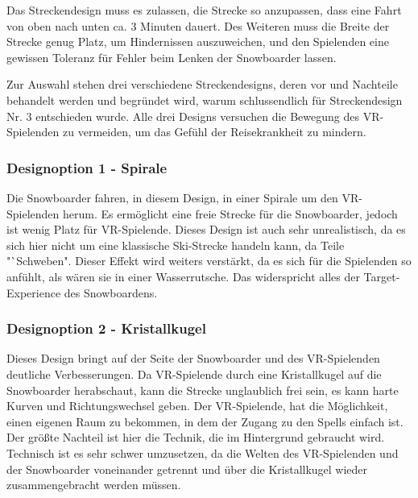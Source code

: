 Das Streckendesign muss es zulassen, die Strecke so anzupassen, dass eine Fahrt von oben nach unten ca. 3 Minuten dauert. Des Weiteren muss die Breite der Strecke genug Platz, um Hindernissen auszuweichen, und den Spielenden eine gewissen Toleranz für Fehler beim Lenken der Snowboarder lassen.

Zur Auswahl stehen drei verschiedene Streckendesigns, deren vor und Nachteile behandelt werden und begründet wird, warum schlussendlich für Streckendesign Nr. 3 entschieden wurde. Alle drei Designs versuchen die Bewegung des VR-Spielenden zu vermeiden, um das Gefühl der Reisekrankheit zu mindern.

\subsubsection{Designoption 1 - Spirale}
Die Snowboarder fahren, in diesem Design, in einer Spirale um den VR-Spielenden herum. Es ermöglicht eine freie Strecke für die Snowboarder, jedoch ist wenig Platz für VR-Spielende. Dieses Design ist auch sehr unrealistisch, da es sich hier nicht um eine klassische Ski-Strecke handeln kann, da Teile "`Schweben". Dieser Effekt wird weiters verstärkt, da es sich für die Spielenden so anfühlt, als wären sie in einer Wasserrutsche. Das widerspricht alles der Target-Experience des Snowboardens.

\subsubsection{Designoption 2 - Kristallkugel}
Dieses Design bringt auf der Seite der Snowboarder und des VR-Spielenden deutliche Verbesserungen. Da VR-Spielende durch eine Kristallkugel auf die Snowboarder herabschaut, kann die Strecke unglaublich frei sein, es kann harte Kurven und Richtungswechsel geben. Der VR-Spielende, hat die Möglichkeit, einen eigenen Raum zu bekommen, in dem der Zugang zu den Spells einfach ist. Der größte Nachteil ist hier die Technik, die im Hintergrund gebraucht wird. Technisch ist es sehr schwer umzusetzen, da die Welten des VR-Spielenden und der Snowboarder voneinander getrennt und über die Kristallkugel wieder zusammengebracht werden müssen.

